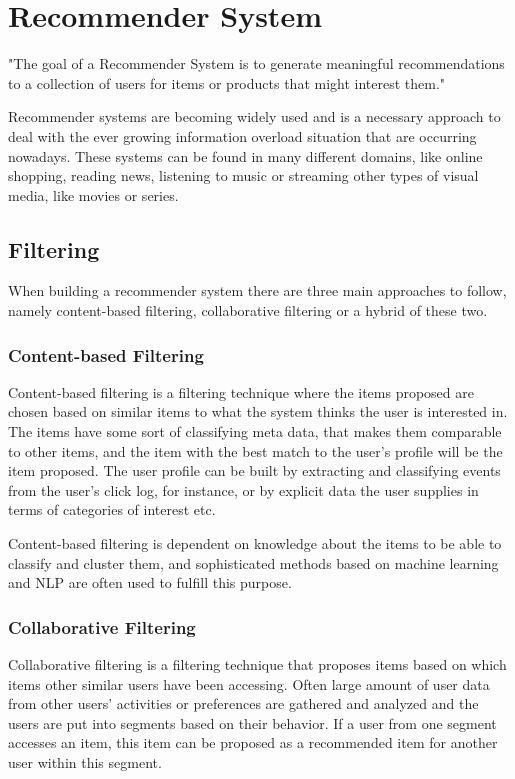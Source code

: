 \section{Recommender System}
\label{theoretical_overview_recommender_system}
"The goal of a Recommender System is to generate meaningful recommendations
to a collection of users for items or products that might interest them."\cite{melville2010recommender}

Recommender systems are becoming widely used and is a necessary approach to deal with the ever growing information overload situation that are occurring nowadays. These systems can be found in many different domains, like online shopping, reading news, listening to music or streaming other types of visual media, like movies or series.

\subsection{Filtering}
When building a recommender system there are three main approaches to follow, namely content-based filtering, collaborative filtering or a hybrid of these two. 

\subsubsection{Content-based Filtering}
Content-based filtering is a filtering technique where the items proposed are chosen based on similar items to what the system thinks the user is interested in. The items have some sort of classifying meta data, that makes them comparable to other items, and the item with the best match to the user's profile will be the item proposed. The user profile can be built by extracting and classifying events from the user's click log, for instance, or by explicit data the user supplies in terms of categories of interest etc.

Content-based filtering is dependent on knowledge about the items to be able to classify and cluster them, and sophisticated methods based on machine learning and NLP are often used to fulfill this purpose. 


\subsubsection{Collaborative Filtering}
Collaborative filtering is a filtering technique that proposes items based on which items other similar users have been accessing. Often large amount of user data from other users' activities or preferences are gathered and analyzed and the users are put into segments based on their behavior. If a user from one segment accesses an item, this item can be proposed as a recommended item for another user within this segment.


